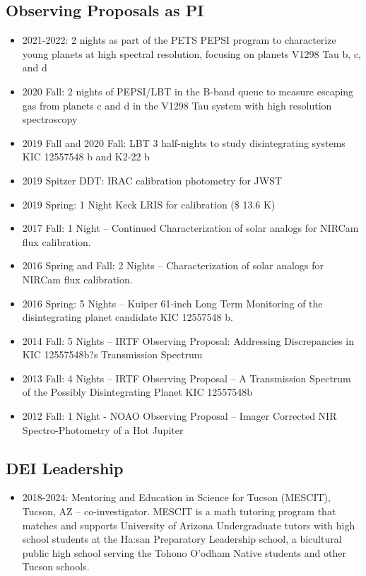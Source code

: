 \documentclass[11pt, oneside]{article}   	%
\begin{document}
\subsection*{Observing Proposals as PI}
\begin{itemize}[noitemsep]
    \item 2021-2022: 2 nights as part of the PETS PEPSI program to characterize young planets at high spectral resolution, focusing on planets V1298 Tau b, c, and d
    \item 2020 Fall: 2 nights of PEPSI/LBT in the B-band queue to measure escaping gas from planets c and d in the V1298 Tau system with high resolution spectroscopy
    \item 2019 Fall and 2020 Fall: LBT 3 half-nights to study disintegrating systems KIC 12557548 b and K2-22 b
    \item 2019 Spitzer DDT: IRAC calibration photometry for JWST
    \item 2019 Spring: 1 Night Keck LRIS for calibration (\$ 13.6 K)
    \item 2017 Fall: 1 Night -- Continued Characterization of solar analogs for NIRCam flux calibration.
    \item 2016 Spring and Fall: 2 Nights -- Characterization of solar analogs for NIRCam flux calibration.
    \item 2016 Spring: 5 Nights -- Kuiper 61-inch Long Term Monitoring of the disintegrating planet candidate KIC 12557548 b.
    \item 2014 Fall: 5 Nights -- IRTF Observing Proposal: Addressing Discrepancies in KIC 12557548b?s Transmission Spectrum
    \item 2013 Fall: 4 Nights -- IRTF Observing Proposal -- A Transmission Spectrum of the Possibly Disintegrating Planet KIC 12557548b
    \item 2012 Fall: 1 Night - NOAO Observing Proposal -- Imager Corrected NIR Spectro-Photometry of a Hot Jupiter
\end{itemize}

\subsection*{DEI Leadership}
\begin{itemize}[noitemsep]
    \item 2018-2024: Mentoring and Education in Science for Tucson (MESCIT), Tucson, AZ -- co-investigator. MESCIT is a math tutoring program that matches and supports University of Arizona Undergraduate tutors with high school students at the Ha:san Preparatory Leadership school, a bicultural public high school serving the Tohono O'odham Native students and other Tucson schools.
\end{itemize}
\end{document}
